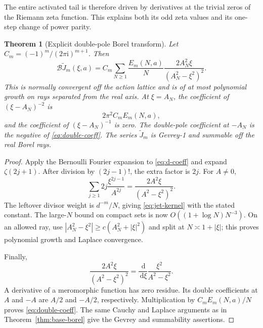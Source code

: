 \documentclass[11pt,a4paper]{article}
\numberwithin{equation}{section}
\newtheorem{theorem}{Theorem}[section]
\theoremstyle{definition}\newtheorem{definition}[theorem]{Definition}
\theoremstyle{remark}\newtheorem{remark}[theorem]{Remark}
\newcommand{\ii}{\mathrm i}\newcommand{\e}{\mathrm e}
\newcommand{\dd}{\,\mathrm d}\newcommand{\Li}{\operatorname{Li}}
\newcommand{\B}{\mathcal B}\newcommand{\Sp}{\mathcal S_+}
\begin{document}
The entire activated tail is therefore driven by derivatives at the
trivial zeros of the Riemann zeta function. This explains both its odd
zeta values and its one-step change of power parity.

\begin{theorem}[Explicit double-pole Borel transform]
\label{thm:jet-borel}
Let $C_m=(-1)^m/(2\pi\ii)^{m+1}$. Then
\begin{equation}
 \B\widetilde J_m(\xi,a)=C_m\sum_{N\ge1}\frac{E_m(N,a)}N
                  \frac{2A_N^2\xi}{(A_N^2-\xi^2)^2}.
 \label{eq:jet-kernel}
\end{equation}
This is normally convergent off the action lattice and is of at most
polynomial growth on rays separated from the real axis. At $\xi=A_N$,
the coefficient of $(\xi-A_N)^{-2}$ is
\begin{equation}
 2\pi^2 C_mE_m(N,a),
 \label{eq:double-coeff}
\end{equation}
and the coefficient of $(\xi-A_N)^{-1}$ is zero. The double-pole
coefficient at $-A_N$ is the negative of \eqref{eq:double-coeff}.
The series $\widetilde J_m$ is Gevrey-1 and summable off the real Borel
rays.
\end{theorem}
\begin{proof}
Apply the Bernoulli Fourier expansion to \eqref{eq:d-coeff} and expand
$\zeta(2j+1)$. After division by $(2j-1)!$, the extra factor is $2j$.
For $A\ne0$,
\begin{equation}
 \sum_{j\ge1}2j\frac{\xi^{2j-1}}{A^{2j}}
                  =\frac{2A^2\xi}{(A^2-\xi^2)^2}.
 \label{eq:double-geometric}
\end{equation}
The leftover divisor weight is $d^{-m}/N$, giving
\eqref{eq:jet-kernel} with the stated constant.
The large-$N$ bound on compact sets is now
$O((1+\log N)N^{-3})$. On an allowed ray, use
$|A_N^2-\xi^2|\ge c(A_N^2+|\xi|^2)$ and split at
$N\asymp1+|\xi|$; this proves polynomial growth and Laplace convergence.

Finally,
\begin{equation}
 \frac{2A^2\xi}{(A^2-\xi^2)^2}
          =\frac{\dd}{\dd\xi}\frac{\xi^2}{A^2-\xi^2}.
 \label{eq:kernel-derivative}
\end{equation}
A derivative of a meromorphic function has zero residue. Its double
coefficients at $A$ and $-A$ are $A/2$ and $-A/2$, respectively.
Multiplication by $C_mE_m(N,a)/N$ proves \eqref{eq:double-coeff}.
The same Cauchy and Laplace arguments as in
Theorem~\ref{thm:base-borel} give the Gevrey and summability assertions.
\end{proof}
\end{document}
